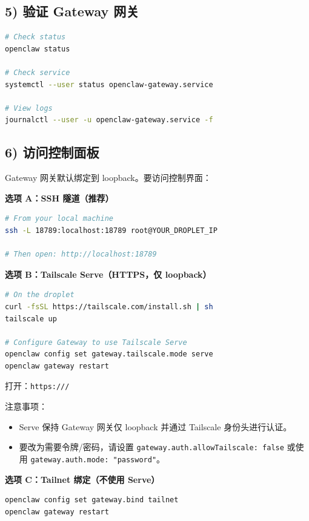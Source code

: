 \subsection{5) 验证 Gateway 网关}


\begin{lstlisting}[language=bash]
# Check status
openclaw status

# Check service
systemctl --user status openclaw-gateway.service

# View logs
journalctl --user -u openclaw-gateway.service -f
\end{lstlisting}


\subsection{6) 访问控制面板}


Gateway 网关默认绑定到 loopback。要访问控制界面：

\textbf{选项 A：SSH 隧道（推荐）}

\begin{lstlisting}[language=bash]
# From your local machine
ssh -L 18789:localhost:18789 root@YOUR_DROPLET_IP

# Then open: http://localhost:18789
\end{lstlisting}


\textbf{选项 B：Tailscale Serve（HTTPS，仅 loopback）}

\begin{lstlisting}[language=bash]
# On the droplet
curl -fsSL https://tailscale.com/install.sh | sh
tailscale up

# Configure Gateway to use Tailscale Serve
openclaw config set gateway.tailscale.mode serve
openclaw gateway restart
\end{lstlisting}


打开：\texttt{https:///}

注意事项：

\begin{itemize}
  \item Serve 保持 Gateway 网关仅 loopback 并通过 Tailscale 身份头进行认证。
  \item 要改为需要令牌/密码，请设置 \texttt{gateway.auth.allowTailscale: false} 或使用 \texttt{gateway.auth.mode: "password"}。
\end{itemize}


\textbf{选项 C：Tailnet 绑定（不使用 Serve）}

\begin{lstlisting}[language=bash]
openclaw config set gateway.bind tailnet
openclaw gateway restart
\end{lstlisting}


